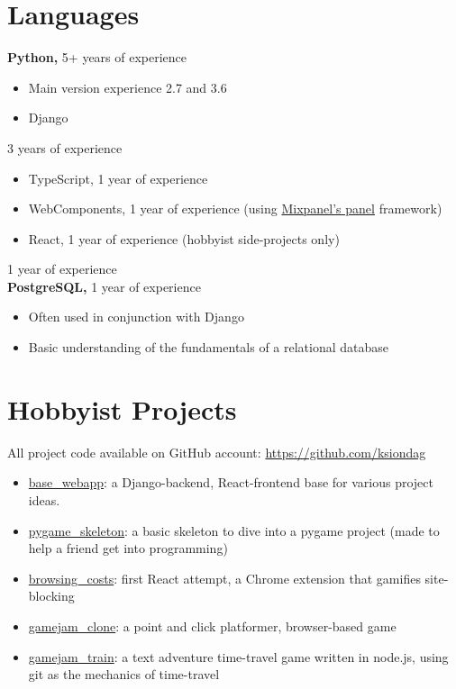 \documentclass{res}
\begin{document}
\begin{resume}
\section{Languages} 
\vspace{0.1in}
  {\bf Python,} 5+ years of experience
    \begin{itemize}
      \item Main version experience 2.7 and 3.6
      \item Django
    \end{itemize}
  \vspace{-11pt}{\bf JavaScript,} 3 years of experience
    \begin{itemize}
      \item TypeScript, 1 year of experience
      \item WebComponents, 1 year of experience (using \href{https://github.com/mixpanel/panel}{Mixpanel's panel}
      framework)
      \item React, 1 year of experience (hobbyist side-projects only)
    \end{itemize}
  \vspace{-11pt}{\bf C++,} 1 year of experience\\
  {\bf PostgreSQL,} 1 year of experience
    \begin{itemize}
      \item Often used in conjunction with Django
      \item Basic understanding of the fundamentals of a relational database
    \end{itemize}

 
\section{Hobbyist Projects}
All project code available on GitHub account: \url{https://github.com/ksiondag}
  \begin{itemize}
    \item \href{https://github.com/ksiondag/base_webapp}{base\_webapp}: a Django-backend, React-frontend
    base for various project ideas.
    \item \href{https://github.com/ksiondag/pygame_skeleton}{pygame\_skeleton}: a basic skeleton to dive
    into a pygame project (made to help a friend get into programming)
    \item \href{https://github.com/ksiondag/browsing_costs}{browsing\_costs}: first React attempt, a
    Chrome extension that gamifies site-blocking
    \item \href{https://github.com/ksiondag/gamejam_clone}{gamejam\_clone}: a point and click platformer,
    browser-based game
    \item \href{https://github.com/ksiondag/gamejam_train}{gamejam\_train}: a text adventure time-travel
    game written in node.js, using git as the mechanics of time-travel
  \end{itemize}
\vspace{0.1in} 
 
\end{resume}
\end{document}
